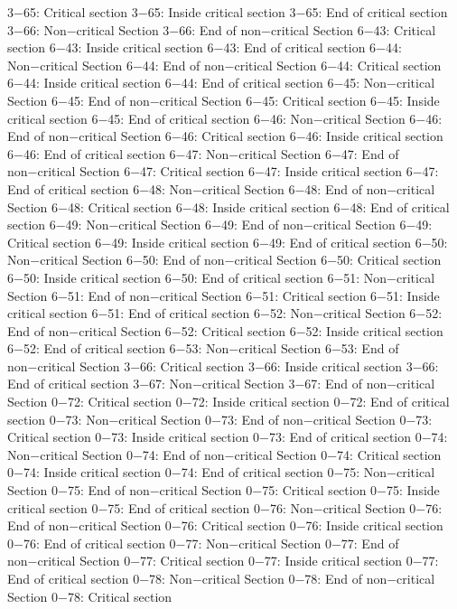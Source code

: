3−65: Critical section
3−65: Inside critical section
3−65: End of critical section
3−66: Non−critical Section
3−66: End of non−critical Section
6−43: Critical section
6−43: Inside critical section
6−43: End of critical section
6−44: Non−critical Section
6−44: End of non−critical Section
6−44: Critical section
6−44: Inside critical section
6−44: End of critical section
6−45: Non−critical Section
6−45: End of non−critical Section
6−45: Critical section
6−45: Inside critical section
6−45: End of critical section
6−46: Non−critical Section
6−46: End of non−critical Section
6−46: Critical section
6−46: Inside critical section
6−46: End of critical section
6−47: Non−critical Section
6−47: End of non−critical Section
6−47: Critical section
6−47: Inside critical section
6−47: End of critical section
6−48: Non−critical Section
6−48: End of non−critical Section
6−48: Critical section
6−48: Inside critical section
6−48: End of critical section
6−49: Non−critical Section
6−49: End of non−critical Section
6−49: Critical section
6−49: Inside critical section
6−49: End of critical section
6−50: Non−critical Section
6−50: End of non−critical Section
6−50: Critical section
6−50: Inside critical section
6−50: End of critical section
6−51: Non−critical Section
6−51: End of non−critical Section
6−51: Critical section
6−51: Inside critical section
6−51: End of critical section
6−52: Non−critical Section
6−52: End of non−critical Section
6−52: Critical section
6−52: Inside critical section
6−52: End of critical section
6−53: Non−critical Section
6−53: End of non−critical Section
3−66: Critical section
3−66: Inside critical section
3−66: End of critical section
3−67: Non−critical Section
3−67: End of non−critical Section
0−72: Critical section
0−72: Inside critical section
0−72: End of critical section
0−73: Non−critical Section
0−73: End of non−critical Section
0−73: Critical section
0−73: Inside critical section
0−73: End of critical section
0−74: Non−critical Section
0−74: End of non−critical Section
0−74: Critical section
0−74: Inside critical section
0−74: End of critical section
0−75: Non−critical Section
0−75: End of non−critical Section
0−75: Critical section
0−75: Inside critical section
0−75: End of critical section
0−76: Non−critical Section
0−76: End of non−critical Section
0−76: Critical section
0−76: Inside critical section
0−76: End of critical section
0−77: Non−critical Section
0−77: End of non−critical Section
0−77: Critical section
0−77: Inside critical section
0−77: End of critical section
0−78: Non−critical Section
0−78: End of non−critical Section
0−78: Critical section
